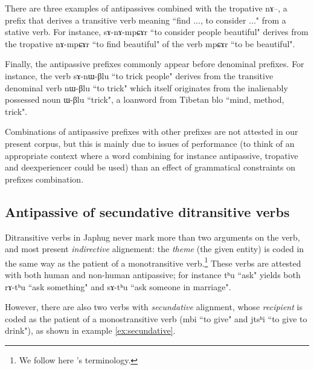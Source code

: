 \documentclass[oldfontcommands,oneside,a4paper,11pt]{article}
\newcommand{\ipa}[1]{{\phon \mbox{#1}}} %
\begin{document}
There are three examples of antipassives combined with the tropative \ipa{nɤ}--, a prefix that derives a transitive verb meaning ``find ..., to consider ..." from a stative verb. For instance,  \ipa{sɤ-nɤ-mpɕɤr} ``to consider people beautiful"  derives from the tropative \ipa{nɤ-mpɕɤr} ``to find beautiful" of the verb \ipa{mpɕɤr} ``to be beautiful".


Finally, the antipassive prefixes commonly appear before denominal prefixes. For instance, the verb \ipa{sɤ-nɯ-βlu} ``to trick people" derives from the transitive denominal verb \ipa{nɯ-βlu} ``to trick" which itself originates from the inalienably possessed noun \ipa{ɯ-βlu} ``trick", a loanword from Tibetan \ipa{blo} ``mind, method, trick".

Combinations of antipassive prefixes with other prefixes are not attested in our present corpus, but this is mainly due to issues of performance (to think of an appropriate context where a word combining for instance antipassive, tropative and deexperiencer could be used) than an effect of grammatical constraints on prefixes combination.


 \subsection{Antipassive of secundative ditransitive verbs} \label{subsec:ditr}
 Ditransitive verbs in Japhug never mark more than two arguments on the verb, and most present \textit{indirective} alignement: the \textit{theme} (the given entity) is coded in the same way as the patient of a monotransitive verb.\footnote{We follow here \citet{malchukov10ditransitive}'s terminology.} These verbs are attested with both human and non-human antipassive; for instance \ipa{tʰu} ``ask" yields both \ipa{rɤ-tʰu} ``ask something" and \ipa{sɤ-tʰu} ``ask someone in marriage".
 
However, there are also  two verbs with \textit{secundative} alignment, whose \textit{recipient} is coded as the patient of a monostransitive verb  (\ipa{mbi} ``to give" and \ipa{jtsʰi} ``to give  to drink"), as shown in example \ref{ex:secundative}.
 
\end{document}
